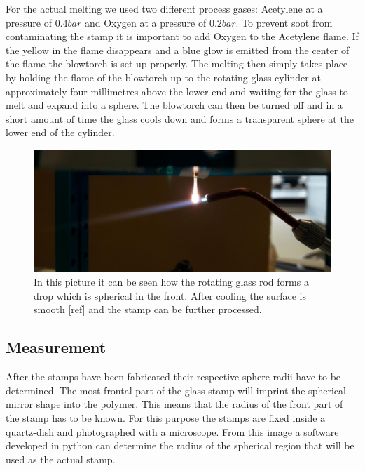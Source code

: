 For the actual melting we used two different process gases: Acetylene at a pressure of $0.4\si{bar}$ and Oxygen at a pressure of $0.2\si{bar}$. To prevent soot from contaminating the stamp it is important to add Oxygen to the Acetylene flame. If the yellow in the flame disappears and a blue glow is emitted from the center of the flame the blowtorch is set up properly. The melting then simply takes place by holding the flame of the blowtorch up to the rotating glass cylinder at approximately four millimetres above the lower end and waiting for the glass to melt and expand into a sphere. The blowtorch can then be turned off and in a short amount of time the glass cools down and forms a transparent sphere at the lower end of the cylinder.
\begin{figure}[H]
	\includegraphics[scale=0.13]{source/melting}
	\caption{In this picture it can be seen how the rotating glass rod forms a drop which is spherical in the front. After cooling the surface is smooth [ref] and the stamp can be further processed.}
\end{figure}

\subsection{Measurement}
After the stamps have been fabricated their respective sphere radii have to be determined. The most frontal part of the glass stamp will imprint the spherical mirror shape into the polymer. This means that the radius of the front part of the stamp has to be known. For this purpose the stamps are fixed inside a quartz-dish and photographed with a microscope. From this image a software developed in python can determine the radius of the spherical region that will be used as the actual stamp.

